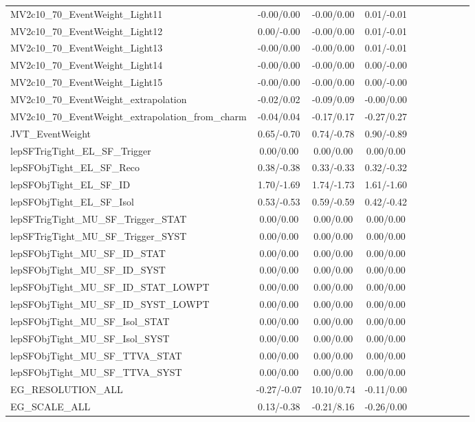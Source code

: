 \begin{table}[h]
\begin{center}
\begin{tabular}{l|ccccccccc}
MV2c10\_70\_EventWeight\_Light11 &-0.00/0.00 &-0.00/0.00 &0.01/-0.01 \\
MV2c10\_70\_EventWeight\_Light12 &0.00/-0.00 &-0.00/0.00 &0.01/-0.01 \\
MV2c10\_70\_EventWeight\_Light13 &-0.00/0.00 &-0.00/0.00 &0.01/-0.01 \\
MV2c10\_70\_EventWeight\_Light14 &-0.00/0.00 &-0.00/0.00 &0.00/-0.00 \\
MV2c10\_70\_EventWeight\_Light15 &-0.00/0.00 &-0.00/0.00 &0.00/-0.00 \\
MV2c10\_70\_EventWeight\_extrapolation &-0.02/0.02 &-0.09/0.09 &-0.00/0.00 \\
MV2c10\_70\_EventWeight\_extrapolation\_from\_charm &-0.04/0.04 &-0.17/0.17 &-0.27/0.27 \\
JVT\_EventWeight &0.65/-0.70 &0.74/-0.78 &0.90/-0.89 \\
lepSFTrigTight\_EL\_SF\_Trigger &0.00/0.00 &0.00/0.00 &0.00/0.00 \\
lepSFObjTight\_EL\_SF\_Reco &0.38/-0.38 &0.33/-0.33 &0.32/-0.32 \\
lepSFObjTight\_EL\_SF\_ID &1.70/-1.69 &1.74/-1.73 &1.61/-1.60 \\
lepSFObjTight\_EL\_SF\_Isol &0.53/-0.53 &0.59/-0.59 &0.42/-0.42 \\
lepSFTrigTight\_MU\_SF\_Trigger\_STAT &0.00/0.00 &0.00/0.00 &0.00/0.00 \\
lepSFTrigTight\_MU\_SF\_Trigger\_SYST &0.00/0.00 &0.00/0.00 &0.00/0.00 \\
lepSFObjTight\_MU\_SF\_ID\_STAT &0.00/0.00 &0.00/0.00 &0.00/0.00 \\
lepSFObjTight\_MU\_SF\_ID\_SYST &0.00/0.00 &0.00/0.00 &0.00/0.00 \\
lepSFObjTight\_MU\_SF\_ID\_STAT\_LOWPT &0.00/0.00 &0.00/0.00 &0.00/0.00 \\
lepSFObjTight\_MU\_SF\_ID\_SYST\_LOWPT &0.00/0.00 &0.00/0.00 &0.00/0.00 \\
lepSFObjTight\_MU\_SF\_Isol\_STAT &0.00/0.00 &0.00/0.00 &0.00/0.00 \\
lepSFObjTight\_MU\_SF\_Isol\_SYST &0.00/0.00 &0.00/0.00 &0.00/0.00 \\
lepSFObjTight\_MU\_SF\_TTVA\_STAT &0.00/0.00 &0.00/0.00 &0.00/0.00 \\
lepSFObjTight\_MU\_SF\_TTVA\_SYST &0.00/0.00 &0.00/0.00 &0.00/0.00 \\
EG\_RESOLUTION\_ALL &-0.27/-0.07 &10.10/0.74 &-0.11/0.00 \\
EG\_SCALE\_ALL &0.13/-0.38 &-0.21/8.16 &-0.26/0.00 \\

\end{tabular}
\end{center}
\end{table}
